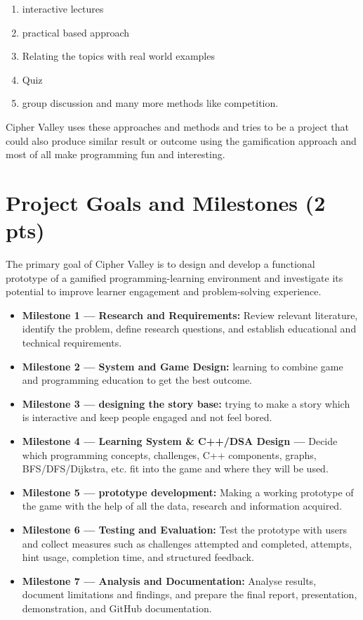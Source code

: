 \documentclass[12pt,a4paper]{article}
\begin{document}
\begin{enumerate}
\item interactive lectures
\item practical based approach
\item Relating the topics with real world examples
\item Quiz
\item group discussion and many more methods like competition.
\end{enumerate}

Cipher Valley uses these approaches and methods and tries to be a project that could also produce similar result or outcome using the gamification approach and most of all make programming fun and interesting.

\section*{Project Goals and Milestones (2 pts)}
The primary goal of Cipher Valley is to design and develop a functional prototype of a gamified programming-learning environment and investigate its potential to improve learner engagement and problem-solving experience.

\begin{itemize}
\item \textbf{Milestone 1 --- Research and Requirements:} Review relevant literature, identify the problem, define research questions, and establish educational and technical requirements.
\item \textbf{Milestone 2 --- System and Game Design:} learning to combine game and programming education to get the best outcome.
\item \textbf{Milestone 3 --- designing the story base:} trying to make a story which is interactive and keep people engaged and not feel bored.
\item \textbf{Milestone 4 --- Learning System \& C++/DSA Design ---} Decide which programming concepts, challenges, C++ components, graphs, BFS/DFS/Dijkstra, etc. fit into the game and where they will be used.
\item \textbf{Milestone 5 --- prototype development:} Making a working prototype of the game with the help of all the data, research and information acquired.
\item \textbf{Milestone 6 --- Testing and Evaluation:} Test the prototype with users and collect measures such as challenges attempted and completed, attempts, hint usage, completion time, and structured feedback.
\item \textbf{Milestone 7 --- Analysis and Documentation:} Analyse results, document limitations and findings, and prepare the final report, presentation, demonstration, and GitHub documentation.
\end{itemize}
\end{document}
